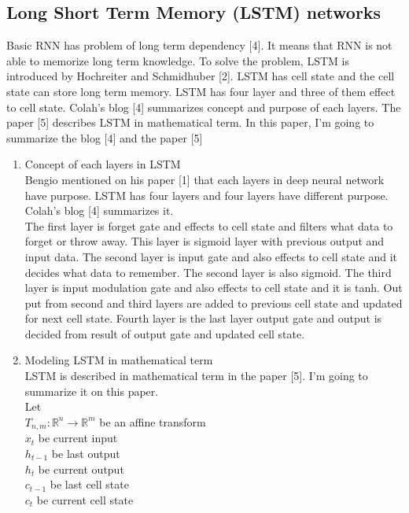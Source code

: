 \documentclass[12pt]{article}
\begin{document}
\subsection{Long Short Term Memory (LSTM) networks}
Basic RNN has problem of long term dependency [4]. It means that RNN is not able to memorize long term knowledge. To solve the problem, LSTM is introduced by Hochreiter and Schmidhuber [2]. LSTM has cell state and the cell state can store long term memory. LSTM has four layer and three of them effect to cell state. Colah's blog [4] summarizes concept and purpose of each layers. The paper [5] describes LSTM in mathematical term. In this paper, I'm going to summarize the blog [4] and the paper [5]

\begin{enumerate}
	\item Concept of each layers in LSTM\\
		Bengio mentioned on his paper [1] that each layers in deep neural network have purpose. LSTM has four layers and four layers have different purpose. Colah's blog [4] summarizes it.\\
		The first layer is forget gate and effects to cell state and filters what data to forget or throw away. This layer is sigmoid layer with previous output and input data. The second layer is input gate and also effects to cell state and it decides what data to remember. The second layer is also sigmoid. The third layer is input modulation gate and also effects to cell state and it is tanh. Out put from second and third layers are added to previous cell state and updated for next cell state. Fourth layer is the last layer output gate and output is decided from result of output gate and updated cell state.

	\item Modeling LSTM in mathematical term\\
		LSTM is described in mathematical term in the paper [5]. I'm going to summarize it on this paper.\\
		Let\\
		$T_{n,m}: \mathbb{R}^n \rightarrow \mathbb{R}^m$ be an affine transform\\
		$x_t$ be current input \\
		$h_{t-1}$ be last output \\
		$h_{t}$ be current output \\
		$c_{t-1}$ be last cell state \\
		$c_{t}$ be current cell state \\
		

\end{enumerate}
\end{document}
